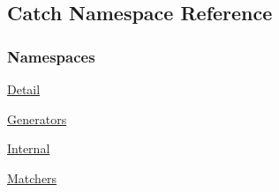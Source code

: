 \hypertarget{namespaceCatch}{\subsection{Catch Namespace Reference}
\label{namespaceCatch}
}
\subsubsection*{Namespaces}
\begin{DoxyCompactItemize}
\item 
\hyperlink{namespaceCatch_1_1Detail}{Detail}
\item 
\hyperlink{namespaceCatch_1_1Generators}{Generators}
\item 
\hyperlink{namespaceCatch_1_1Internal}{Internal}
\item 
\hyperlink{namespaceCatch_1_1Matchers}{Matchers}
\end{DoxyCompactItemize}
